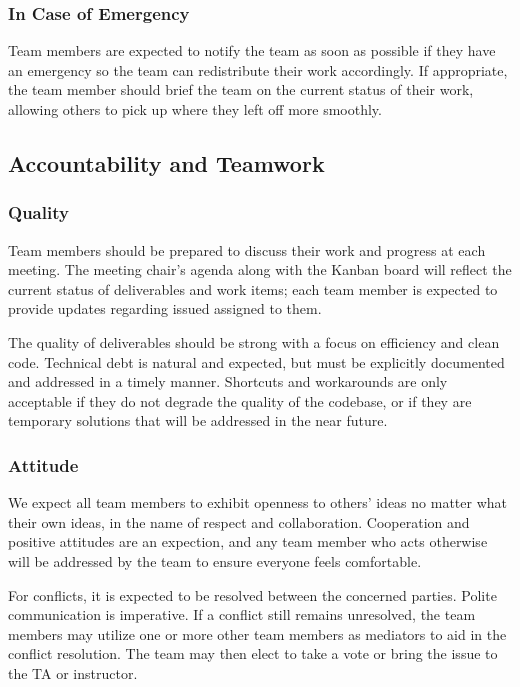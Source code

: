 \documentclass{article}
\begin{document}
\subsubsection*{In Case of Emergency}

Team members are expected to notify the team as soon as possible if they have an emergency so the team can redistribute their work accordingly. If appropriate, the team member should brief the team on the current status of their work, allowing others to pick up where they left off more smoothly.

\subsection*{Accountability and Teamwork}

\subsubsection*{Quality} 

\noindent Team members should be prepared to discuss their work and progress at each meeting. The meeting chair's agenda along with the Kanban board will reflect the current status of deliverables and work items; each team member is expected to provide updates regarding issued assigned to them. 

The quality of deliverables should be strong with a focus on efficiency and clean code. Technical debt is natural and expected, but must be explicitly documented and addressed in a timely manner. Shortcuts and workarounds are only acceptable if they do not degrade the quality of the codebase, or if they are temporary solutions that will be addressed in the near future.
\subsubsection*{Attitude}

\noindent We expect all team members to exhibit openness to others' ideas no matter what their own ideas, in the name of respect and collaboration. Cooperation and positive attitudes are an expection, and any team member who acts otherwise will be addressed by the team to ensure everyone feels comfortable. 

For conflicts, it is expected to be resolved between the concerned parties. Polite communication is imperative. If a conflict still remains unresolved, the team members may utilize one or more other team members as mediators to aid in the conflict resolution. The team may then elect to take a vote or bring the issue to the TA or instructor.
\end{document}
